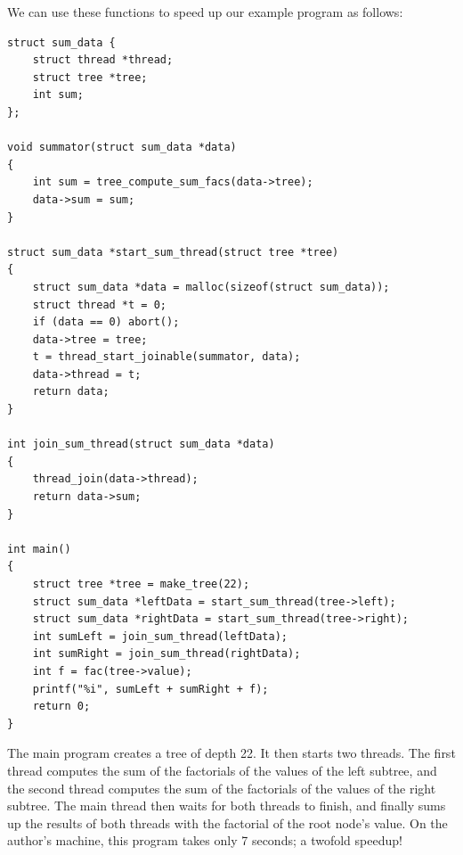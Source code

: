 \documentclass{article}
\begin{document}
We can use these functions to speed up our example program as
follows:
\begin{lstlisting}
struct sum_data {
    struct thread *thread;
    struct tree *tree;
    int sum;
};

void summator(struct sum_data *data)
{
    int sum = tree_compute_sum_facs(data->tree);
    data->sum = sum;
}

struct sum_data *start_sum_thread(struct tree *tree)
{
    struct sum_data *data = malloc(sizeof(struct sum_data));
    struct thread *t = 0;
    if (data == 0) abort();
    data->tree = tree;
    t = thread_start_joinable(summator, data);
    data->thread = t;
    return data;
}

int join_sum_thread(struct sum_data *data)
{
    thread_join(data->thread);
    return data->sum;
}

int main()
{
    struct tree *tree = make_tree(22);
    struct sum_data *leftData = start_sum_thread(tree->left);
    struct sum_data *rightData = start_sum_thread(tree->right);
    int sumLeft = join_sum_thread(leftData);
    int sumRight = join_sum_thread(rightData);
    int f = fac(tree->value);
    printf("%i", sumLeft + sumRight + f);
    return 0;
}
\end{lstlisting}
The main program creates a tree of depth 22. It then starts two
threads. The first thread computes the sum of the factorials of
the values of the left subtree, and the second thread computes
the sum of the factorials of the values of the right subtree.
The main thread then waits for both threads to finish, and
finally sums up the results of both threads with the factorial of
the root node's value. On the author's machine, this program
takes only 7 seconds; a twofold speedup!
\end{document}
